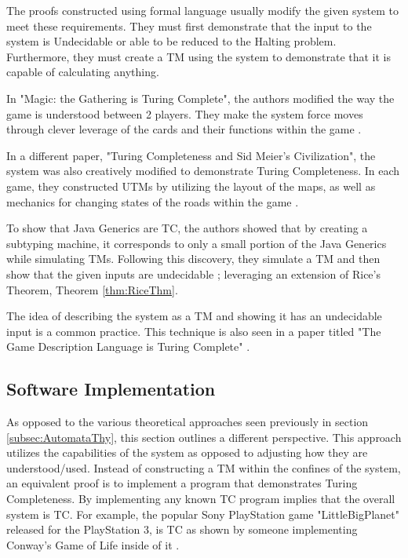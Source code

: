 The proofs constructed using formal language usually modify the given system to meet these requirements.
They must first demonstrate that the input to the system is Undecidable or able to be reduced to the Halting problem.
Furthermore, they must create a TM using the system to demonstrate that it is capable of calculating anything.

In "Magic: the Gathering is Turing Complete", the authors modified the way the game is understood between 2 players.
They make the system force moves through clever leverage of the cards and their functions within the game \cite{MtGTC}.

In a different paper, "Turing Completeness and Sid Meier's Civilization", the system was also creatively modified to demonstrate Turing Completeness.
In each game, they constructed UTMs by utilizing the layout of the maps, as well as mechanics for changing states of the roads within the game \cite{CivTC}.

To show that Java Generics are TC, the authors showed that by creating a subtyping machine, it corresponds to only a small portion of the Java Generics while simulating TMs.
Following this discovery, they simulate a TM and then show that the given inputs are undecidable \cite{JavaGenericsTC}; leveraging an extension of Rice's Theorem, Theorem \ref{thm:RiceThm}.

The idea of describing the system as a TM and showing it has an undecidable input is a common practice.
This technique is also seen in a paper titled "The Game Description Language is Turing Complete" \cite{GDLTC}.

\subsection{Software Implementation}\label{subsec:SoftwareImplementation}

As opposed to the various theoretical approaches seen previously in section \ref{subsec:AutomataThy}, this section outlines a different perspective.
This approach utilizes the capabilities of the system as opposed to adjusting how they are understood/used.
Instead of constructing a TM within the confines of the system, an equivalent proof is to implement a program that demonstrates Turing Completeness.
By implementing any known TC program implies that the overall system is TC.
For example, the popular Sony PlayStation game "LittleBigPlanet" released for the PlayStation 3, is TC as shown by someone implementing Conway's Game of Life inside of it \cite{LittleBigCGoL}.

